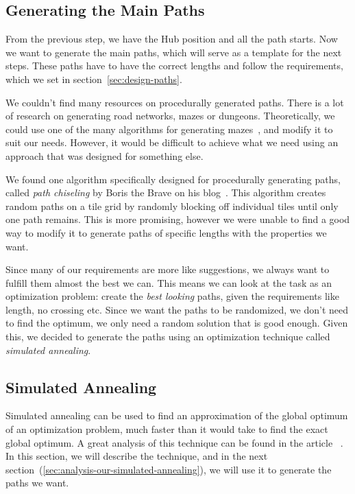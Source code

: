 \subsection{Generating the Main Paths}

From the previous step, we have the Hub position and all the path starts.
Now we want to generate the main paths, which will serve as a template for the next steps.
These paths have to have the correct lengths and follow the requirements, which we set in section~\ref{sec:design-paths}.

We couldn't find many resources on procedurally generated paths.
There is a lot of research on generating road networks, mazes or dungeons.
Theoretically, we could use one of the many algorithms for generating mazes~\cite{MazeWiki}, and modify it to suit our needs.
However, it would be difficult to achieve what we need using an approach that was designed for something else.

We found one algorithm specifically designed for procedurally generating paths, called \emph{path chiseling} by Boris the Brave on his blog~\cite{PathChiseling1,PathChiseling2}.
This algorithm creates random paths on a tile grid by randomly blocking off individual tiles until only one path remains.
This is more promising, however we were unable to find a good way to modify it to generate paths of specific lengths with the properties we want.

Since many of our requirements are more like suggestions, we always want to fulfill them almost the best we can.
This means we can look at the task as an optimization problem: create the \emph{best looking} paths, given the requirements like length, no crossing etc.
Since we want the paths to be randomized, we don't need to find the optimum, we only need a random solution that is good enough.
Given this, we decided to generate the paths using an optimization technique called \emph{simulated annealing}.

\subsection{Simulated Annealing}\label{sec:analysis-simulated-annealing}

Simulated annealing can be used to find an approximation of the global optimum of an optimization problem, much faster than it would take to find the exact global optimum.
A great analysis of this technique can be found in the article ~\cite{SimulatedAnnealing}.
In this section, we will describe the technique, and in the next section~(\ref{sec:analysis-our-simulated-annealing}), we will use it to generate the paths we want.


